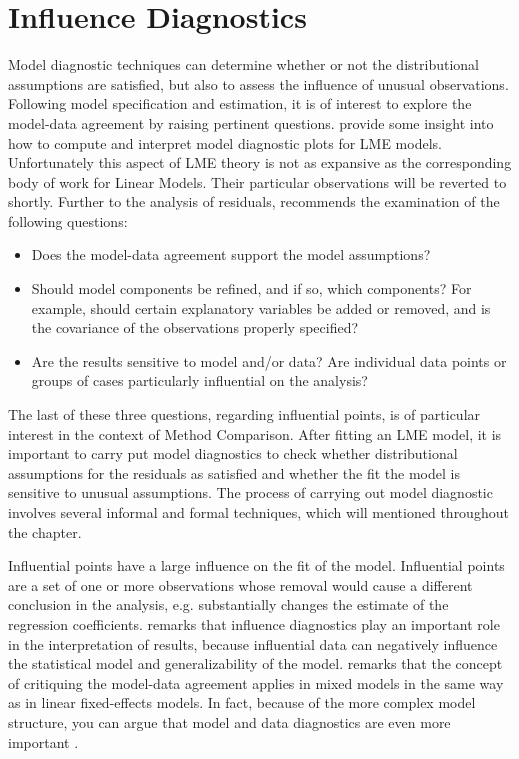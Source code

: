 \documentclass[12pt, a4paper]{report}
\theoremstyle{plain}
\theoremstyle{definition}
\theoremstyle{remark}
\begin{document}
	\section{Influence Diagnostics}
	Model diagnostic techniques can determine whether or not the distributional assumptions are satisfied, but also to assess the influence of unusual observations. Following model specification and estimation, it is of interest to explore the model-data agreement by raising pertinent questions. \citet{pb} provide some insight into how to compute and interpret model diagnostic plots for LME models. Unfortunately this aspect of LME theory is not as expansive as the corresponding body of work for Linear Models. Their particular observations will be reverted to shortly. Further to the analysis of residuals, \citet{schabenberger} recommends the examination of the following questions:
	\begin{itemize}
		\item Does the model-data agreement support the model assumptions?
		\item Should model components be refined, and if so, which components? For example, should certain explanatory variables
		be added or removed, and is the covariance of the observations properly specified?
		\item Are the results sensitive to model and/or data? Are individual data points or groups of cases particularly
		influential on the analysis?
	\end{itemize}
	
	The last of these three questions, regarding influential points, is of particular interest in the context of Method Comparison. After fitting an LME model, it is important to carry put model diagnostics to check whether distributional assumptions for the residuals as satisfied and whether the fit the model is sensitive to unusual assumptions. The process of carrying out model
	diagnostic involves several informal and formal techniques, which will mentioned throughout the chapter.
	
	Influential points have a large influence on the fit of the model. Influential points are a set of one or more observations whose removal would cause a different conclusion in the analysis, e.g. substantially changes the estimate of the regression coefficients. \citet{west} remarks that influence diagnostics play an important role in the interpretation of results, because influential data can negatively influence the statistical model and generalizability of the model. \citet{schabenberger} remarks that the concept of critiquing the model-data agreement applies in mixed models in the same way as in linear
	fixed-effects models. In fact, because of the more complex model structure, you can argue that model and
	data diagnostics are even more important \citep{west}.
	
\end{document}
